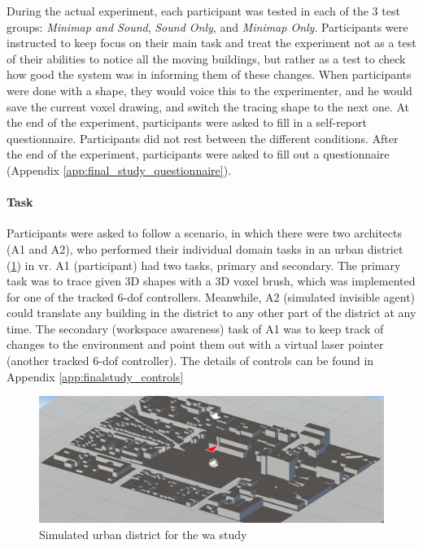 During the actual experiment, each participant was tested in each of the 3 test groups: \textit{Minimap and Sound}, \textit{Sound Only}, and \textit{Minimap Only}. Participants were instructed to keep focus on their main task and treat the experiment not as a test of their abilities to notice all the moving buildings, but rather as a test to check how good the system was in informing them of these changes. 
When participants were done with a shape, they would voice this to the experimenter, and he would save the current voxel drawing, and switch the tracing shape to the next one.
At the end of the experiment, participants were asked to fill in a self-report questionnaire.
Participants did not rest between the different conditions. 
After the end of the experiment, participants were asked to fill out a questionnaire (Appendix \ref{app:final_study_questionnaire}).

\paragraph{Task}
Participants were asked to follow a scenario, in which there were two architects (A1 and A2), who performed their individual domain tasks in an urban district (\ref{fig:urbandistrict}) in \gls{vr}. A1 (participant) had two tasks, primary and secondary. The primary task was to trace given 3D shapes with a 3D voxel brush, which was implemented for one of the tracked 6-\gls{dof} controllers. Meanwhile, A2 (simulated invisible agent) could translate any building in the district to any other part of the district at any time. The secondary (workspace awareness) task of A1 was to keep track of changes to the environment and point them out with a virtual laser pointer (another tracked 6-\gls{dof} controller). The details of controls can be found in Appendix \ref{app:finalstudy_controls}

\begin{figure}
	\centering
	\includegraphics[width=0.7\linewidth]{figures/urban_district}
	\caption{Simulated urban district for the \gls{wa} study}
	\label{fig:urbandistrict}
\end{figure}


